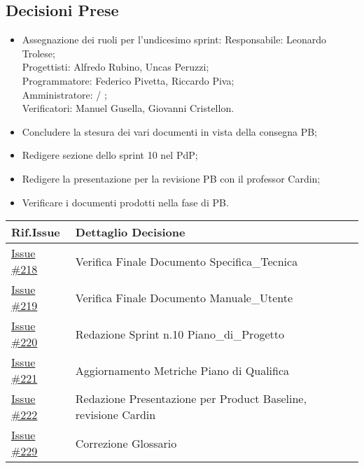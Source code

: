 \documentclass[10pt]{article}
\begin{document}
\subsection{Decisioni Prese}
    \begin{itemize}
        \item   Assegnazione dei ruoli per l'undicesimo sprint:
                Responsabile: Leonardo Trolese;\\
                Progettisti: Alfredo Rubino, Uncas Peruzzi;\\
                Programmatore: Federico Pivetta, Riccardo Piva;\\
                Amministratore: / ;\\
                Verificatori: Manuel Gusella, Giovanni Cristellon.
        \item Concludere la stesura dei vari documenti in vista della consegna PB;
        \item Redigere sezione dello sprint 10 nel PdP;
        \item Redigere la presentazione per la revisione PB con il professor Cardin;
        \item Verificare i documenti prodotti nella fase di PB.
    \end{itemize}
    \begin{center}
    \begin{tabular}{|>{\centering\arraybackslash}m{3cm}|>{\centering\arraybackslash}m{12cm}|}
	\hline
	\textbf{Rif.Issue} & \textbf{Dettaglio Decisione}\\
	\hline
            \href{https://github.com/SevenBitsSwe/7BitsDocs/issues/218}{Issue \#218} & Verifica Finale Documento Specifica\_Tecnica\\
            \href{https://github.com/SevenBitsSwe/7BitsDocs/issues/219}{Issue \#219} & Verifica Finale Documento Manuale\_Utente\\
            \href{https://github.com/SevenBitsSwe/7BitsDocs/issues/220}{Issue \#220} & Redazione Sprint n.10 Piano\_di\_Progetto\\
            \href{https://github.com/SevenBitsSwe/7BitsDocs/issues/221}{Issue \#221} & Aggiornamento Metriche Piano di Qualifica\\
            \href{https://github.com/SevenBitsSwe/7BitsDocs/issues/222}{Issue \#222} & Redazione Presentazione per Product Baseline, revisione Cardin\\
            \href{https://github.com/SevenBitsSwe/7BitsDocs/issues/229}{Issue \#229} & Correzione Glossario\\
        \hline
    \end{tabular}
    \end{center}
\end{document}
